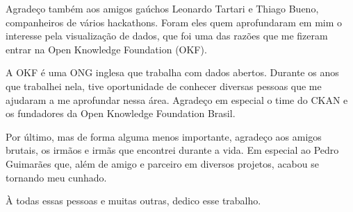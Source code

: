 Agradeço também aos amigos gaúchos Leonardo Tartari e Thiago Bueno,
companheiros de vários hackathons. Foram eles quem aprofundaram em mim o
interesse pela visualização de dados, que foi uma das razões que me fizeram
entrar na Open Knowledge Foundation (OKF).

A OKF é uma ONG inglesa que trabalha com dados abertos. Durante os anos que
trabalhei nela, tive oportunidade de conhecer diversas pessoas que me ajudaram
a me aprofundar nessa área. Agradeço em especial o time do CKAN e os fundadores
da Open Knowledge Foundation Brasil.

Por último, mas de forma alguma menos importante, agradeço aos amigos brutais,
os irmãos e irmãs que encontrei durante a vida. Em especial ao Pedro Guimarães
que, além de amigo e parceiro em diversos projetos, acabou se tornando meu
cunhado.

À todas essas pessoas e muitas outras, dedico esse trabalho.
